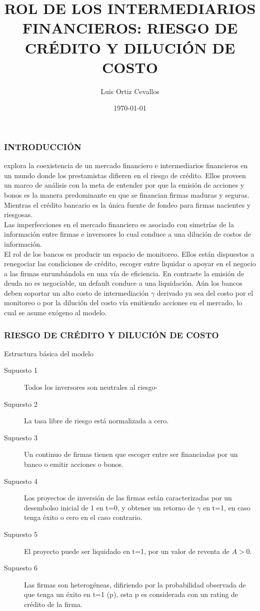 \documentclass[10pt, xcolor=table, x11names]{beamer}
\title[]{ROL DE LOS INTERMEDIARIOS FINANCIEROS: RIESGO DE CRÉDITO Y DILUCIÓN DE COSTO}
\author[Luis Ortiz]{Luis Ortiz Cevallos}
\institute[SECMCA]{\bf SECMCA}
\date[\today]{\footnotesize \today}
\begin{document}
\begin{frame}
\titlepage
\end{frame}




\begin{frame}
	\frametitle{{\normalsize INTRODUCCIÓN} {}}
\cite{Freixas2000} explora la coexistencia de un mercado financiero e intermediarios financieros en un mundo donde los prestamistas difieren en el riesgo de crédito. Ellos proveen un marco de análisis con la meta de entender por que la emisión de acciones y bonos es la manera predominante en que se financian firmas maduras y seguras. Mientras el crédito bancario es la única fuente de fondeo para firmas nacientes y riesgosas.\\
Las imperfecciones en el mercado financiero es asociado con simetrías de la información entre firmas e inversores lo cual conduce a una dilución de costos de información. \\
El rol de los bancos es producir un espacio de monitoreo. Ellos están dispuestos a renegociar las condiciones de crédito, escoger entre liquidar o apoyar en el negocio a las firmas enrumbándola  en una vía de eficiencia. En contraste la emisión de deuda no es negociable, un default conduce a una liquidación.   
Aún los bancos deben soportar un alto costo de intermediación $\gamma$ derivado ya sea del costo por el monitoreo o por la dilución del costo vía emitiendo acciones en el mercado, lo cual se asume exógeno al modelo.


 

\end{frame}

\begin{frame}
    \frametitle{{\normalsize RIESGO DE CRÉDITO Y DILUCIÓN DE COSTO} {}}
    
    \begin{block} {Estructura básica del modelo}
        \begin{description}
            \item[Supuesto 1]  Todos los inversores son neutrales al riesgo-
            \item[Supuesto 2] La tasa libre de riesgo está normalizada a cero.
            \item[Supuesto 3] Un continuo de firmas tienen que escoger entre ser financiadas por un banco o emitir acciones o bonos.
            \item[Supuesto 4] Los proyectos de inversión de las firmas están caracterizadas por un desembolso inicial de 1 en t=0, y obtener un retorno de $\gamma$ en t=1, en caso tenga éxito o cero en el caso contrario.
           \item[Supuesto 5] El proyecto puede ser liquidado en t=1, por un valor de reventa de $A>0$.
           \item[Supuesto 6] Las firmas son heterogéneas, difiriendo por la probabilidad observada de que tenga un éxito en t=1 (p), esta p es considerada con un rating de crédito de la firma.          
      \end{description}
        
    \end{block}	
    
\end{frame}
\end{document}
